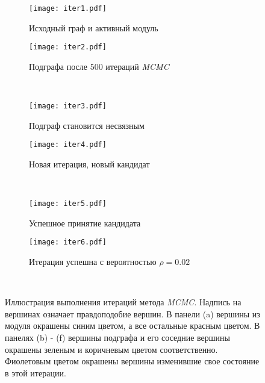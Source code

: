 \begin{figure}
    \begin{subfigure}{.5\textwidth}
        \centering
        \texttt{[image: iter1.pdf]}
        \caption{Исходный граф и активный модуль} 
    \end{subfigure}%
    \begin{subfigure}{.5\textwidth}
        \centering
        \texttt{[image: iter2.pdf]}
        \caption{Подграфа после $500$ итераций \emph{MCMC}}
    \end{subfigure}\\[1ex]
    \begin{subfigure}{.5\textwidth}
        \centering
        \texttt{[image: iter3.pdf]}
        \caption{Подграф становится несвязным}
    \end{subfigure}%
    \begin{subfigure}{.5\textwidth}
        \centering
        \texttt{[image: iter4.pdf]}
        \caption{Новая итерация, новый кандидат}
   \end{subfigure}\\[1ex]
   \begin{subfigure}{.5\textwidth}
        \centering
        \texttt{[image: iter5.pdf]}
        \caption{Успешное принятие кандидата} 
   \end{subfigure}%
   \begin{subfigure}{.5\textwidth}
        \centering
        \texttt{[image: iter6.pdf]}
        \caption{Итерация успешна с вероятностью $\rho=0.02$}
   \end{subfigure}\\[1ex]
    \centering
    \caption{
        Иллюстрация выполнения итераций метода \emph{MCMC}.  Надпись на вершинах
        означает правдоподобие вершин.  В панели (a) вершины из модуля окрашены
        синим цветом, а все остальные красным цветом.  В панелях (b) - (f)
        вершины подграфа и его соседние вершины окрашены зеленым и коричневым
        цветом соответственно. Фиолетовым цветом окрашены вершины изменившие свое
        состояние в этой итерации.
    }%
    \label{recombiter}%
\end{figure}

